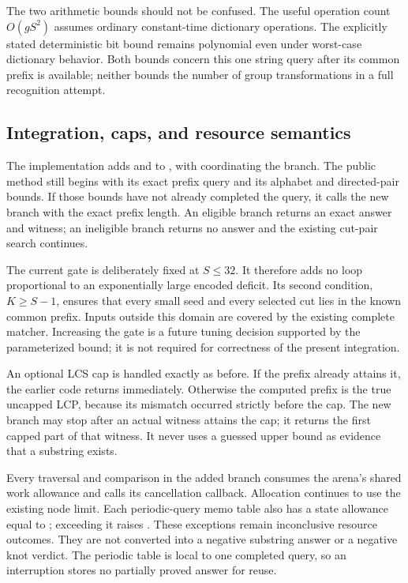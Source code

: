 The two arithmetic bounds should not be confused. The useful operation
count $O(gS^2)$ assumes ordinary constant-time dictionary operations.
The explicitly stated deterministic bit bound remains polynomial even
under worst-case dictionary behavior. Both bounds concern this one
string query after its common prefix is available; neither bounds the
number of group transformations in a full recognition attempt.

\subsection{Integration, caps, and resource semantics}

The implementation adds  and
 to , with
 coordinating the branch.
The public  method still begins with its exact prefix
query and its alphabet and directed-pair bounds. If those bounds have
not already completed the query, it calls the new branch with the exact
prefix length. An eligible branch returns an exact answer and witness;
an ineligible branch returns no answer and the existing cut-pair search
continues.

The current gate is deliberately fixed at $S\le32$. It therefore
adds no loop proportional to an exponentially large encoded deficit.
Its second condition, $K\ge S-1$, ensures that every small seed and
every selected cut lies in the known common prefix. Inputs outside this
domain are covered by the existing complete matcher. Increasing the
gate is a future tuning decision supported by the parameterized bound;
it is not required for correctness of the present integration.

An optional LCS cap is handled exactly as before. If the prefix already
attains it, the earlier code returns immediately. Otherwise the computed
prefix is the true uncapped LCP, because its mismatch occurred strictly
before the cap. The new branch may stop after an actual witness attains
the cap; it returns the first capped part of that witness. It never
uses a guessed upper bound as evidence that a substring exists.

Every traversal and comparison in the added branch consumes the arena's
shared work allowance and calls its cancellation callback. Allocation
continues to use the existing node limit. Each periodic-query memo table
also has a state allowance equal to ; exceeding it raises
. These exceptions remain inconclusive resource
outcomes. They are not converted into a negative substring answer or a
negative knot verdict. The periodic table is local to one completed
query, so an interruption stores no partially proved answer for reuse.

